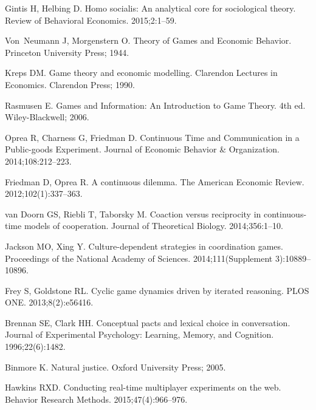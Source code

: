 \documentclass[10pt,letterpaper]{article}
\begin{document}
\begin{thebibliography}{10}
Gintis H, Helbing D.
\newblock Homo socialis: An analytical core for sociological theory.
\newblock Review of Behavioral Economics. 2015;2:1--59.

Von~Neumann J, Morgenstern O.
\newblock Theory of Games and Economic Behavior.
\newblock Princeton University Press; 1944.

Kreps DM.
\newblock Game theory and economic modelling.
\newblock Clarendon Lectures in Economics. Clarendon Press; 1990.

Rasmusen E.
\newblock Games and Information: An Introduction to Game Theory.
\newblock 4th ed. Wiley-Blackwell; 2006.

Oprea R, Charness G, Friedman D.
\newblock Continuous Time and Communication in a Public-goods Experiment.
\newblock Journal of Economic Behavior \& Organization. 2014;108:212--223.

Friedman D, Oprea R.
\newblock A continuous dilemma.
\newblock The American Economic Review. 2012;102(1):337--363.

van Doorn GS, Riebli T, Taborsky M.
\newblock Coaction versus reciprocity in continuous-time models of cooperation.
\newblock Journal of Theoretical Biology. 2014;356:1--10.

Jackson MO, Xing Y.
\newblock Culture-dependent strategies in coordination games.
\newblock Proceedings of the National Academy of Sciences. 2014;111(Supplement
  3):10889--10896.

Frey S, Goldstone RL.
\newblock Cyclic game dynamics driven by iterated reasoning.
\newblock PLOS ONE. 2013;8(2):e56416.

Brennan SE, Clark HH.
\newblock Conceptual pacts and lexical choice in conversation.
\newblock Journal of Experimental Psychology: Learning, Memory, and Cognition.
  1996;22(6):1482.

Binmore K.
\newblock Natural justice.
\newblock Oxford University Press; 2005.

Hawkins RXD.
\newblock Conducting real-time multiplayer experiments on the web.
\newblock Behavior Research Methods. 2015;47(4):966--976.


\end{thebibliography}
\end{document}
